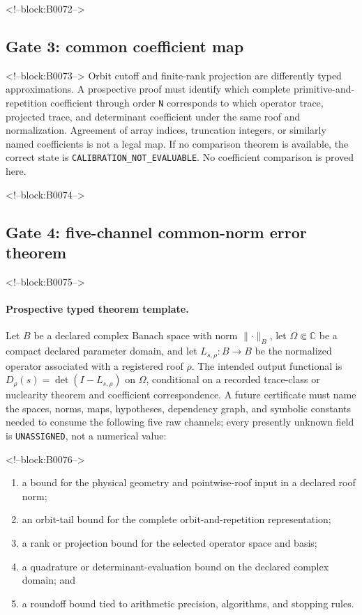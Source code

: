 \documentclass[11pt,a4paper]{article}
\providecommand{\tightlist}{\setlength{\itemsep}{0pt}\setlength{\parskip}{0pt}}
\begin{document}
<!--block:B0072-->
\subsection{Gate 3: common coefficient map}

<!--block:B0073-->
Orbit cutoff and finite-rank projection are differently typed approximations. A prospective proof must identify which complete primitive-and-repetition coefficient through order \texttt{N} corresponds to which operator trace, projected trace, and determinant coefficient under the same roof and normalization. Agreement of array indices, truncation integers, or similarly named coefficients is not a legal map. If no comparison theorem is available, the correct state is \texttt{CALIBRATION\_NOT\_EVALUABLE}. No coefficient comparison is proved here.

<!--block:B0074-->
\subsection{Gate 4: five-channel common-norm error theorem}

<!--block:B0075-->
\paragraph{Prospective typed theorem template.} Let \(B\) be a declared complex Banach space with norm \(\lVert\cdot\rVert_B\), let \(\Omega\Subset\mathbb{C}\) be a compact declared parameter domain, and let \(L_{s,\rho}:B\to B\) be the normalized operator associated with a registered roof \(\rho\). The intended output functional is \(D_\rho(s)=\det(I-L_{s,\rho})\) on \(\Omega\), conditional on a recorded trace-class or nuclearity theorem and coefficient correspondence. A future certificate must name the spaces, norms, maps, hypotheses, dependency graph, and symbolic constants needed to consume the following five raw channels; every presently unknown field is \texttt{UNASSIGNED}, not a numerical value:

<!--block:B0076-->
\begin{enumerate}
\def\labelenumi{\arabic{enumi}.}
\tightlist
\item
  a bound for the physical geometry and pointwise-roof input in a declared roof norm;
\item
  an orbit-tail bound for the complete orbit-and-repetition representation;
\item
  a rank or projection bound for the selected operator space and basis;
\item
  a quadrature or determinant-evaluation bound on the declared complex domain; and
\item
  a roundoff bound tied to arithmetic precision, algorithms, and stopping rules.
\end{enumerate}
\end{document}
